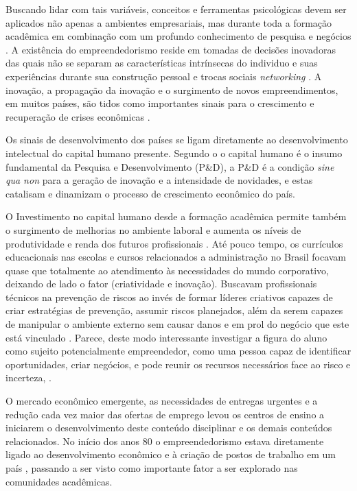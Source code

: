 Buscando lidar com tais variáveis, conceitos e ferramentas psicológicas devem ser aplicados não apenas a ambientes empresariais, mas durante toda a formação acadêmica em combinação com um profundo conhecimento de pesquisa e negócios \cite{zhao_relationship_2010}. A existência do empreendedorismo reside em tomadas de decisões inovadoras das quais não se separam as características intrínsecas do individuo e suas experiências durante sua construção pessoal e trocas sociais \textit{networking} \cite{alencar_intencao_2019}. A inovação, a propagação da inovação e o surgimento de novos empreendimentos, em muitos países, são tidos como importantes sinais para o crescimento e recuperação de crises econômicas \cite{silva_mudancestrutural_2017}. 

Os sinais de desenvolvimento dos países se ligam diretamente ao desenvolvimento intelectual do capital humano presente. Segundo o  o capital humano é o insumo fundamental da Pesquisa e Desenvolvimento (P\&D), a P\&D é a condição \textit{sine qua non} para a geração de inovação e a intensidade de novidades, e estas catalisam e dinamizam o processo de crescimento econômico do país.


O Investimento no capital humano desde a formação acadêmica permite também o surgimento de melhorias no ambiente laboral e aumenta os níveis de produtividade e renda dos futuros profissionais \cite{macedo_capital_2019}. Até pouco tempo, os currículos educacionais nas escolas e cursos relacionados a administração no Brasil focavam quase que totalmente ao atendimento às necessidades do mundo corporativo, deixando de lado o fator (criatividade e inovação). Buscavam profissionais técnicos na prevenção de riscos ao invés de formar líderes criativos capazes de criar estratégias de prevenção, assumir riscos planejados, além da serem capazes de manipular o ambiente externo sem causar danos e em prol do negócio que este está vinculado \cite{palmer_chip_2019}. Parece, deste modo interessante investigar a figura do aluno como sujeito potencialmente empreendedor, como uma pessoa capaz de identificar oportunidades, criar negócios, e pode reunir os recursos necessários face ao risco e incerteza, \cite{pietrovski_alise_2019}.

O mercado econômico emergente, as necessidades de entregas urgentes e a redução cada vez maior das ofertas de emprego levou os centros de ensino a iniciarem o desenvolvimento deste conteúdo disciplinar e os demais conteúdos relacionados. No início dos anos 80 o empreendedorismo estava diretamente ligado ao desenvolvimento econômico e à criação de postos de trabalho em um país \cite{rodrigues_intencao_2019}, passando a ser visto como importante fator a ser explorado nas comunidades acadêmicas. 


